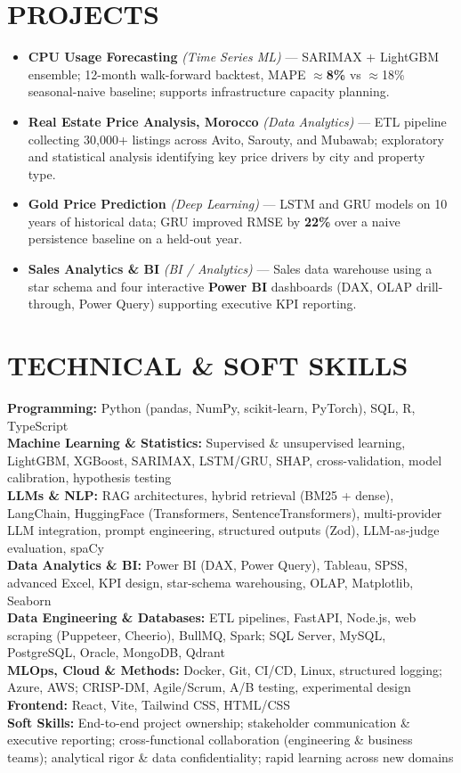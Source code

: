 \documentclass[10pt,a4paper]{article}
\begin{document}
\section*{PROJECTS}
\begin{itemize}
    \item \textbf{CPU Usage Forecasting} \textit{(Time Series ML)} — SARIMAX + LightGBM ensemble; 12-month walk-forward backtest, MAPE $\approx$\textbf{8\%} vs $\approx$18\% seasonal-naive baseline; supports infrastructure capacity planning.
    \item \textbf{Real Estate Price Analysis, Morocco} \textit{(Data Analytics)} — ETL pipeline collecting 30{,}000+ listings across Avito, Sarouty, and Mubawab; exploratory and statistical analysis identifying key price drivers by city and property type.
    \item \textbf{Gold Price Prediction} \textit{(Deep Learning)} — LSTM and GRU models on 10 years of historical data; GRU improved RMSE by \textbf{22\%} over a naive persistence baseline on a held-out year.
    \item \textbf{Sales Analytics \& BI} \textit{(BI / Analytics)} — Sales data warehouse using a star schema and four interactive \textbf{Power BI} dashboards (DAX, OLAP drill-through, Power Query) supporting executive KPI reporting.
\end{itemize}

\section*{TECHNICAL \& SOFT SKILLS}
\textbf{Programming:} Python (pandas, NumPy, scikit-learn, PyTorch), SQL, R, TypeScript \\
\textbf{Machine Learning \& Statistics:} Supervised \& unsupervised learning, LightGBM, XGBoost, SARIMAX, LSTM/GRU, SHAP, cross-validation, model calibration, hypothesis testing \\
\textbf{LLMs \& NLP:} RAG architectures, hybrid retrieval (BM25 + dense), LangChain, HuggingFace (Transformers, SentenceTransformers), multi-provider LLM integration, prompt engineering, structured outputs (Zod), LLM-as-judge evaluation, spaCy \\
\textbf{Data Analytics \& BI:} Power BI (DAX, Power Query), Tableau, SPSS, advanced Excel, KPI design, star-schema warehousing, OLAP, Matplotlib, Seaborn \\
\textbf{Data Engineering \& Databases:} ETL pipelines, FastAPI, Node.js, web scraping (Puppeteer, Cheerio), BullMQ, Spark; SQL Server, MySQL, PostgreSQL, Oracle, MongoDB, Qdrant \\
\textbf{MLOps, Cloud \& Methods:} Docker, Git, CI/CD, Linux, structured logging; Azure, AWS; CRISP-DM, Agile/Scrum, A/B testing, experimental design \\
\textbf{Frontend:} React, Vite, Tailwind CSS, HTML/CSS \\
\textbf{Soft Skills:} End-to-end project ownership; stakeholder communication \& executive reporting; cross-functional collaboration (engineering \& business teams); analytical rigor \& data confidentiality; rapid learning across new domains
\end{document}
